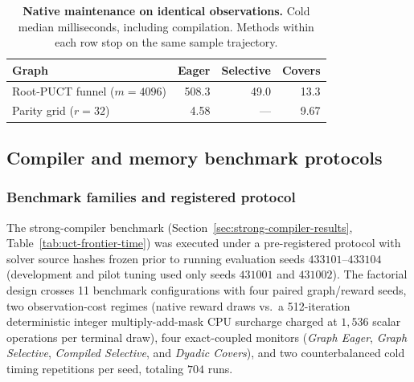 \documentclass{article}
\theoremstyle{plain}
\theoremstyle{definition}
\begin{document}
\begin{table}[!htbp]
\caption{\textbf{Native maintenance on identical observations.} Cold median milliseconds, including compilation. Methods within each row stop on the same sample trajectory.}
\label{tab:main-runtime}\label{fig:computational-efficiency}
\centering\small
\begin{tabular}{@{}lrrr@{}}
\toprule
Graph & Eager & Selective & Covers\\
\midrule
Root-PUCT funnel ($m=4096$) & 508.3 & 49.0 & 13.3\\
Parity grid ($r=32$) & 4.58 & --- & 9.67\\
\bottomrule
\end{tabular}
\end{table}

\subsection{Compiler and memory benchmark protocols}
\label{app:compiler-benchmarks}
\label{app:frontier-data}

\subsubsection{Benchmark families and registered protocol}

The strong-compiler benchmark (Section~\ref{sec:strong-compiler-results}, Table~\ref{tab:uct-frontier-time}) was executed under a pre-registered protocol with solver source hashes frozen prior to running evaluation seeds $433101$--$433104$ (development and pilot tuning used only seeds $431001$ and $431002$). The factorial design crosses 11 benchmark configurations with four paired graph/reward seeds, two observation-cost regimes (native reward draws vs.\ a 512-iteration deterministic integer multiply-add-mask CPU surcharge charged at $1{,}536$ scalar operations per terminal draw), four exact-coupled monitors (\emph{Graph Eager}, \emph{Graph Selective}, \emph{Compiled Selective}, and \emph{Dyadic Covers}), and two counterbalanced cold timing repetitions per seed, totaling $704$ runs.
\end{document}
